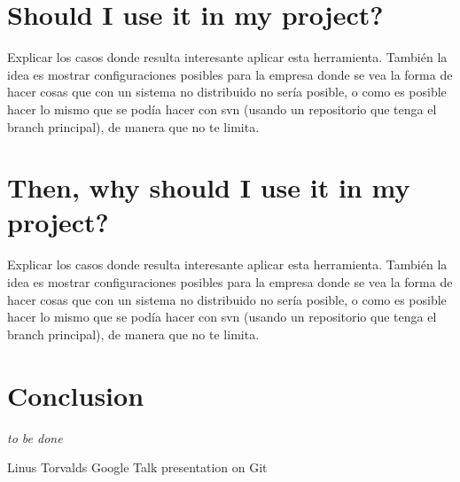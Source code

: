 \documentclass[%
	final,
	notitlepage,
	narroweqnarray,
	inline,
	twoside,
	]{ieee}
\newcommand{\latexiie}{\LaTeX2{\Large$_\varepsilon$}}
\begin{document}
\section{Should I use it in my project?}

Explicar los casos donde resulta interesante aplicar esta herramienta. 
También la idea es mostrar configuraciones posibles para la empresa donde 
se vea la forma de hacer cosas que con un sistema no distribuido no sería 
posible, o como es posible hacer lo mismo que se podía hacer con svn 
(usando un repositorio que tenga el branch principal), de manera que 
no te limita.

\section{Then, why should I use it in my project?}

Explicar los casos donde resulta interesante aplicar esta herramienta. 
También la idea es mostrar configuraciones posibles para la empresa donde 
se vea la forma de hacer cosas que con un sistema no distribuido no sería 
posible, o como es posible hacer lo mismo que se podía hacer con svn 
(usando un repositorio que tenga el branch principal), de manera que 
no te limita.

\section{Conclusion}

\emph{to be done}



\begin{thebibliography}{1}

% 

Linus Torvalds
\newblock Google Talk presentation on Git

\end{thebibliography}

\end{document}

